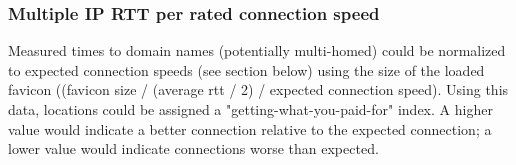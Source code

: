 \subsubsection{Multiple IP RTT per rated connection speed}
Measured \rtt times to domain names (potentially multi-homed) could be normalized to expected connection speeds (see section below) using the size of the loaded favicon ((favicon size / (average rtt / 2) / expected connection speed). Using this data, locations could be assigned a "getting-what-you-paid-for" index. A higher value would indicate a better connection relative to the expected connection; a lower value would indicate connections worse than expected.
